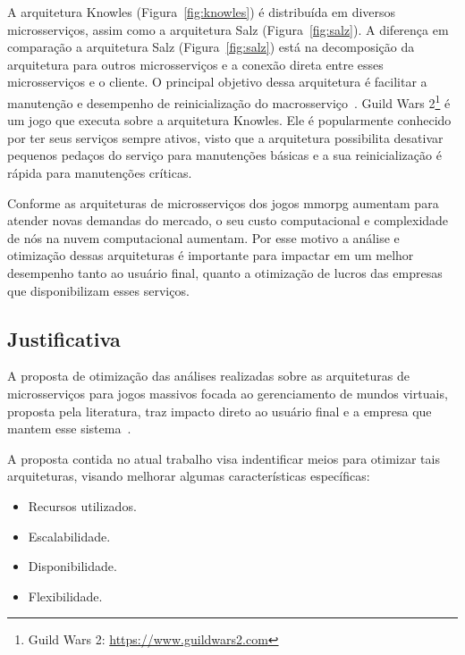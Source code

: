A arquitetura Knowles (Figura~\ref{fig:knowles}) é distribuída em diversos microsserviços, assim como a arquitetura Salz (Figura~\ref{fig:salz}).
%
A diferença em comparação a arquitetura Salz (Figura~\ref{fig:salz}) está na decomposição da arquitetura para outros microsserviços e a conexão direta entre esses microsserviços e o cliente.
%
O principal objetivo dessa arquitetura é facilitar a manutenção e desempenho de reinicialização do macrosserviço~\cite{stephenclarkewillson2017}.
%
Guild Wars 2\footnote[3]{Guild Wars 2: \url{https://www.guildwars2.com}} é um jogo que executa sobre a arquitetura Knowles.
%
Ele é popularmente conhecido por ter seus serviços sempre ativos, visto que a arquitetura possibilita desativar pequenos pedaços do serviço para manutenções básicas e a sua reinicialização é rápida para manutenções críticas.

Conforme as arquiteturas de microsserviços dos jogos \ac{mmorpg} aumentam para atender novas demandas do mercado, o seu custo computacional e complexidade de nós na nuvem computacional aumentam.
%
Por esse motivo a análise e otimização dessas arquiteturas é importante para impactar em um melhor desempenho tanto ao usuário final, quanto a otimização de lucros das empresas que disponibilizam esses serviços.

\subsection{Justificativa}

A proposta de otimização das análises realizadas sobre as arquiteturas de microsserviços para jogos massivos focada ao gerenciamento de mundos virtuais, proposta pela literatura, traz impacto direto ao usuário final e a empresa que mantem esse sistema~\cite{1417630}.

A proposta contida no atual trabalho visa indentificar meios para otimizar tais arquiteturas, visando melhorar algumas características específicas:

\begin{itemize}
  \item Recursos utilizados.
  \item Escalabilidade.
  \item Disponibilidade.
  \item Flexibilidade.
\end{itemize}

